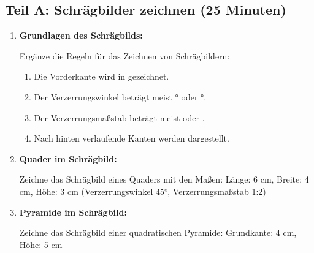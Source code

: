 \subsection*{Teil A: Schrägbilder zeichnen (25 Minuten)}

\begin{enumerate}[label=\arabic*.]

    \item \textbf{Grundlagen des Schrägbilds:}

    Ergänze die Regeln für das Zeichnen von Schrägbildern:

    \begin{enumerate}[label=\alph*)]
        \item Die Vorderkante wird in \underline{\hspace{4cm}} gezeichnet.

        \item Der Verzerrungswinkel beträgt meist \underline{\hspace{2cm}}° oder \underline{\hspace{2cm}}°.

        \item Der Verzerrungsmaßstab beträgt meist \underline{\hspace{2cm}} oder \underline{\hspace{2cm}}.

        \item Nach hinten verlaufende Kanten werden \underline{\hspace{4cm}} dargestellt.
    \end{enumerate}

    \vspace{1cm}

    \item \textbf{Quader im Schrägbild:}

    Zeichne das Schrägbild eines Quaders mit den Maßen:
    Länge: 6 cm, Breite: 4 cm, Höhe: 3 cm
    (Verzerrungswinkel 45°, Verzerrungsmaßstab 1:2)

    \vspace{8cm}

    \item \textbf{Pyramide im Schrägbild:}

    Zeichne das Schrägbild einer quadratischen Pyramide:
    Grundkante: 4 cm, Höhe: 5 cm

    \vspace{7cm}

\end{enumerate}